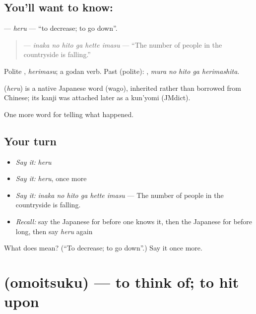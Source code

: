 \subsection*{You'll want to know: }
\textbf{} — \emph{heru} — \textquotedblleft{}to decrease; to go down\textquotedblright{}.

\begin{quote}
\textbf{  } — \emph{inaka no hito ga hette imasu} — \textquotedblleft{}The number of people in the countryside is falling.\textquotedblright{}
\end{quote}

Polite \textbf{}, \emph{herimasu}; a godan verb. Past (polite): \textbf{  }, \emph{mura no hito ga herimashita}.

\begin{cousinweb}
\textbf{} (\emph{heru}) is a native Japanese word (wago), inherited rather than borrowed from Chinese; its kanji was attached later as a kun'yomi (JMdict).
\end{cousinweb}

\begin{grammarlens}[title={What you've built}]
One more word for telling what happened.
\end{grammarlens}

\subsection*{Your turn}
\begin{itemize}
\raggedright
  \item \emph{Say it:} \emph{heru}
  \item \emph{Say it:} \emph{heru}, once more
  \item \emph{Say it:} \emph{inaka no hito ga hette imasu} — The number of people in the countryside is falling.
  \item \emph{Recall:} say the Japanese for before one knows it, then the Japanese for before long, then say \emph{heru} again
\end{itemize}

\begin{tcolorbox}[breakable,colback=teal!4,colframe=teal!35!black,title={Before you move on}]
What does  mean? (\textquotedblleft{}To decrease; to go down\textquotedblright{}.) Say it once more.
\end{tcolorbox}
\section[\texorpdfstring{\ja{おもいつく} (omoitsuku)}{おもいつく (omoitsuku)}]{ (omoitsuku) — to think of; to hit upon}

